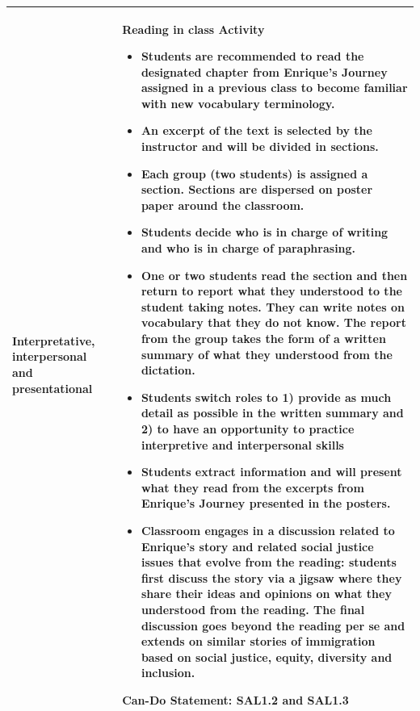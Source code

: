 \documentclass[output=paper]{langscibook}
\begin{document}
\begin{table}
\begin{tabularx}{\textwidth}{p{2cm}Q}
\midrule
Interpretative, interpersonal and presentational & \textbf{Reading} \textbf{in} \textbf{class} \textbf{Activity}
\begin{itemize}[leftmargin=*]
\setlength{\itemsep}{0pt}
\item Students are recommended to read the designated chapter from Enrique’s Journey assigned in a previous class to become familiar with new vocabulary terminology.
\item An excerpt of the text is selected by the instructor and will be divided in sections.
\item Each group (two students) is assigned a section. Sections are dispersed on poster paper around the classroom.
\item Students decide who is in charge of writing and who is in charge of paraphrasing.
\item One or two students read the section and then return to report what they understood to the student taking notes. They can write notes on vocabulary that they do not know. The report from the group takes the form of a written summary of what they understood from the dictation.
\item Students switch roles to 1) provide as much detail as possible in the written summary and 2) to have an opportunity to practice interpretive and interpersonal skills
\item Students extract information and will present what they read from the excerpts from Enrique's Journey presented in the posters.
\item Classroom engages in a discussion related to Enrique’s story and related social justice issues that evolve from the reading: students first discuss the story via a jigsaw where they share their ideas and opinions on what they understood from the reading. The final discussion goes beyond the reading per se and extends on similar stories of immigration based on social justice, equity, diversity and inclusion.
\end{itemize}
Can-Do Statement: SAL1.2 and SAL1.3\\
\midrule
\end{tabularx}
\end{table}
\end{document}
